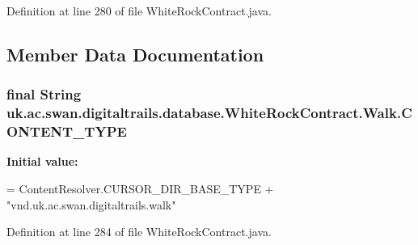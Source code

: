 Definition at line 280 of file White\+Rock\+Contract.\+java.



\subsection{Member Data Documentation}
\hypertarget{classuk_1_1ac_1_1swan_1_1digitaltrails_1_1database_1_1_white_rock_contract_1_1_walk_a7193f4a3c07e73c898f0074306f63439}{
\subsubsection[{C\+O\+N\+T\+E\+N\+T\+\_\+\+T\+Y\+P\+E}]{\setlength{\rightskip}{0pt plus 5cm}final String uk.\+ac.\+swan.\+digitaltrails.\+database.\+White\+Rock\+Contract.\+Walk.\+C\+O\+N\+T\+E\+N\+T\+\_\+\+T\+Y\+P\+E\hspace{0.3cm}{\ttfamily [static]}}}\label{classuk_1_1ac_1_1swan_1_1digitaltrails_1_1database_1_1_white_rock_contract_1_1_walk_a7193f4a3c07e73c898f0074306f63439}
{\bfseries Initial value\+:}
\begin{DoxyCode}
= ContentResolver.CURSOR\_DIR\_BASE\_TYPE +
                \textcolor{stringliteral}{"vnd.uk.ac.swan.digitaltrails.walk"}
\end{DoxyCode}


Definition at line 284 of file White\+Rock\+Contract.\+java.


